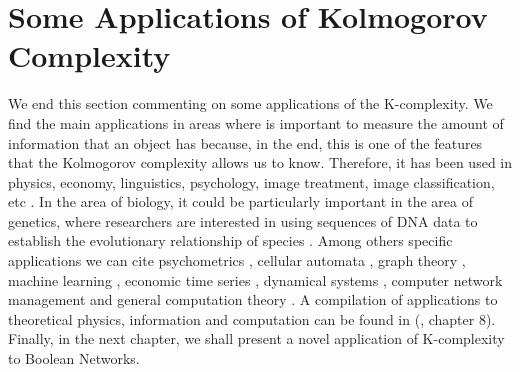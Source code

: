 \section{Some Applications of Kolmogorov Complexity}
We end this section commenting on some applications of the K-complexity. We find the main applications in areas where is important to measure the amount of information that an object has because, in the end, this is one of the features that the Kolmogorov complexity allows us to know. Therefore, it has been used in physics, economy, linguistics, psychology, image treatment, image classification, etc \cite{faibles_complexites} \cite{decomposition}. In the area of biology, it could be particularly important in the area of genetics, where researchers are interested in using sequences of DNA data to establish the evolutionary relationship of species \cite{dna}. Among others specific applications we can cite psychometrics \cite{psy}, cellular automata \cite{kolmo_automata1} \cite{kolmo_automata2}, graph theory \cite{kolmo_graph}, machine learning \cite{kolmo_machin1} \cite{kolmo_machin2}, economic time series \cite{kolmo_finan1} \cite{kolmo_finan2}, dynamical systems \cite{kolmo_dynamical}, computer network management \cite{kolmo_computer} and general computation theory \cite{kolmo_computer2}. A compilation of applications to theoretical physics, information and computation can be found in (\cite{kolmo_book}, chapter 8). Finally, in the next chapter, we shall present a novel application of K-complexity to Boolean Networks.